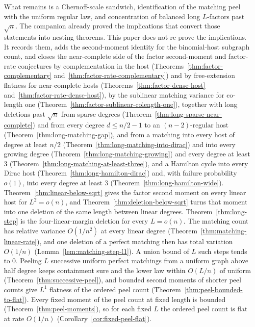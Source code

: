 \documentclass[11pt]{article}
\begin{document}
What remains is a Chernoff-scale sandwich, identification of the matching peel
with the uniform regular law, and concentration of balanced long \(L\)-factors
past \(\sqrt{n}\).
The companion already proved the implications that convert those statements
into nesting theorems.
This paper does not re-prove the implications.
It records them, adds the second-moment identity for the binomial-host
subgraph count, and closes the near-complete side of the factor second-moment
and factor-rate conjectures by complementation in the host
(Theorems~\ref{thm:factor-complementary} and~\ref{thm:factor-rate-complementary})
and by free-extension flatness for near-complete hosts
(Theorems~\ref{thm:factor-dense-host} and~\ref{thm:factor-rate-dense-host}),
by the sublinear matching variance for co-length one
(Theorem~\ref{thm:factor-sublinear-colength-one}),
together with long deletions past \(\sqrt{n}\) from sparse degrees
(Theorem~\ref{thm:long-sparse-near-complete}) and from every degree
\(d\le n/2-1\) to an \((n-2)\)-regular host
(Theorem~\ref{thm:long-matching-gap}), and from a matching into every host of
degree at least \(n/2\) (Theorem~\ref{thm:long-matching-into-dirac}) and into
every growing degree (Theorem~\ref{thm:long-matching-growing}) and every
degree at least \(3\) (Theorem~\ref{thm:long-matching-at-least-three}), and a
Hamilton cycle into every Dirac host (Theorem~\ref{thm:long-hamilton-dirac})
and, with failure probability \(o(1)\), into every degree at least \(3\)
(Theorem~\ref{thm:long-hamilton-wide}).
Theorem~\ref{thm:linear-below-sqrt} gives the factor second moment on every
linear host for \(L^2=o(n)\), and
Theorem~\ref{thm:deletion-below-sqrt} turns that moment into one deletion of
the same length between linear degrees.
Theorem~\ref{thm:long-step} is the four-linear-margin deletion for every
\(L=o(n)\). The matching count has relative variance \(O(1/n^2)\) at every
linear degree (Theorem~\ref{thm:matching-linear-rate}), and one deletion of a
perfect matching then has total variation \(O(1/n)\)
(Lemma~\ref{lem:matching-step-l1}). A union bound of \(L\) such steps tends to
\(0\). Peeling \(L\) successive uniform perfect matchings from a uniform graph
above half degree keeps containment sure and the lower law within \(O(L/n)\)
of uniform (Theorem~\ref{thm:successive-peel}), and bounded second moments of
shorter peel counts give \(L^1\) flatness of the ordered peel count
(Theorem~\ref{thm:peel-bounded-to-flat}).
Every fixed moment of the peel count at fixed length is bounded
(Theorem~\ref{thm:peel-moments}), so for each fixed \(L\) the ordered peel
count is flat at rate \(O(1/n)\) (Corollary~\ref{cor:fixed-peel-flat}).
\end{document}
